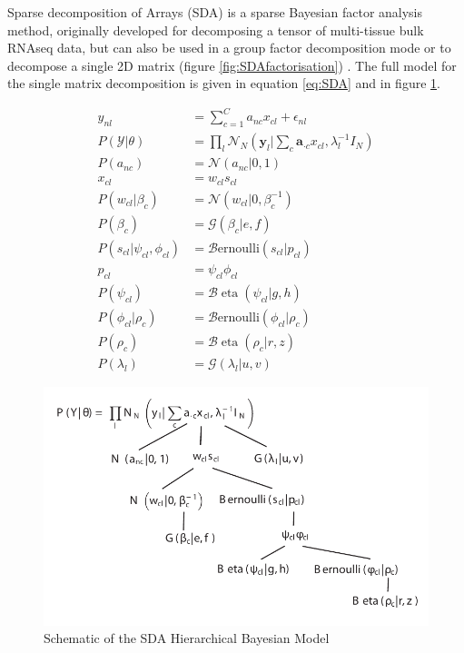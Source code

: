 Sparse decomposition of Arrays (SDA) is a sparse Bayesian factor analysis method, originally developed for decomposing a tensor of multi-tissue bulk RNAseq data, but can also be used in a group factor decomposition mode or to decompose a single 2D matrix (figure \ref{fig:SDAfactorisation}) \parencite{Hore2015Latent, Hore2016Tensor}.
The full model for the single matrix decomposition is given in equation \ref{eq:SDA} and in figure \ref{fig:SDAmodel}.

\begin{equation}
\begin{aligned}
y_{n l} &= \sum_{c=1}^{C} a_{n c} x_{c l}+\epsilon_{n l} \\
P(\mathcal{Y} | \theta) &=\prod_{l} \mathcal{N}_{N}\left(\mathbf{y}_{l} | \sum_{c} \mathbf{a}_{\cdot c} x_{c l}, \lambda_{l}^{-1} I_{N}\right) \\ 
P\left(a_{n c}\right) &=\mathcal{N}\left(a_{n c} | 0,1\right) \\
x_{c l} &= w_{c l} s_{c l} \\
P\left(w_{c l} | \beta_{c}\right) &=\mathcal{N}\left(w_{c l} | 0, \beta_{c}^{-1}\right) \\
P\left(\beta_{c}\right) &=\mathcal{G}\left(\beta_{c} | e, f\right) \\ 
P\left(s_{c l} | \psi_{c l}, \phi_{c l}\right) &=\mathcal{B} \text{ernoulli}\left(s_{c l} | p_{c l}\right) \\ 
p_{c l} &= \psi_{c l} \phi_{c l} \\
P\left(\psi_{c l}\right) &=\mathcal{B} \operatorname{eta}\left(\psi_{c l} | g, h\right) \\
P\left(\phi_{c l} | \rho_{c}\right) &=\mathcal{B} \text{ernoulli}\left(\phi_{c l} | \rho_{c}\right) \\
P\left(\rho_{c}\right) &=\mathcal{B} \operatorname{eta}\left(\rho_{c} | r, z\right) \\
P\left(\lambda_{l}\right) &=\mathcal{G}\left(\lambda_{l} | u, v\right) 
\label{eq:SDA}
\end{aligned}
\end{equation}

\begin{figure}[H]
	\centering
	\includegraphics[width=\textwidth]{figures/intro/SDA.pdf}
	\caption[SDA Model]{Schematic of the SDA Hierarchical Bayesian Model}
	\label{fig:SDAmodel}
\end{figure}

